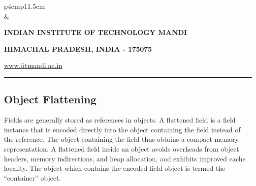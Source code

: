 \documentclass[12 pt, a4paper]{article}
\newcommand{\HRule}{\rule{\linewidth}{1mm}}
\begin{document}
\clearpage

\pagestyle{empty}
\vskip 0.2cm
	\begin{tabular}{p{4cm}p{11.5cm}}
		  \\
		& \centering \large\bf\phantom{Empty line}\\ 
		\rule{0pt}{1pt} \centering \large\bf{INDIAN INSTITUTE OF TECHNOLOGY MANDI} \\
		\rule{0pt}{1pt} \centering \large\bf{HIMACHAL PRADESH, INDIA - 175075} \\
		\rule{0pt}{1pt} \centering \underline{\href{www.iitmandi.ac.in}{www.iitmandi.ac.in}}\\
	\end{tabular}
\noindent

{\raggedleft{}\HRule}

\subsection{Object Flattening}
Fields are generally stored as references in objects. 
A flattened field is a field instance that is encoded directly into the object containing the field
instead of the reference. 
The object containing the field thus obtains a compact memory representation.
A flattened field inside an object avoids overheads from object headers, 
memory indirections, and heap allocation, and exhibits improved cache locality.
The object which contains the encoded
field object is termed the ``container'' object. 
\end{document}
